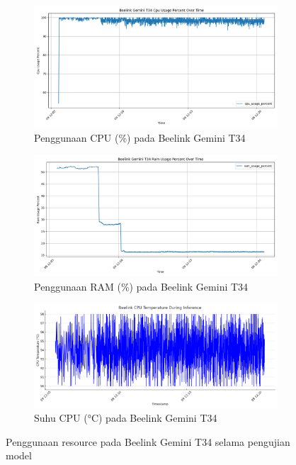 \begin{figure}[htbp]
  \centering
  \begin{subfigure}[b]{0.9\textwidth}
    \includegraphics[width=\textwidth]{gambar/bab4-beelink-cpu-over-time.png}
    \caption{Penggunaan CPU (\%) pada Beelink Gemini T34}
  \end{subfigure}
  
  \begin{subfigure}[b]{0.9\textwidth}
    \includegraphics[width=\textwidth]{gambar/bab4-beelink-ram-over-time.png}
    \caption{Penggunaan RAM (\%) pada Beelink Gemini T34}
  \end{subfigure}
  
  \begin{subfigure}[b]{0.9\textwidth}
    \includegraphics[width=\textwidth]{gambar/bab4-beelink-temp-cpu-over-time.png}
    \caption{Suhu CPU (°C) pada Beelink Gemini T34}
  \end{subfigure}
  
  \caption{Penggunaan resource pada Beelink Gemini T34 selama pengujian model}
  \label{fig:beelink_resource_usage}
\end{figure}

